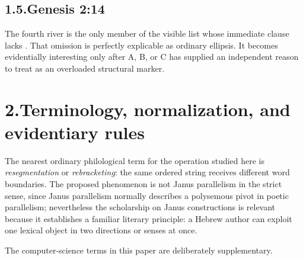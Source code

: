 \subsection*{1.5.\quad Genesis 2:14}


The fourth river is the only member of the visible list whose immediate clause lacks .  That omission is perfectly explicable as ordinary ellipsis.  It becomes evidentially interesting only after A, B, or C has supplied an independent reason to treat  as an overloaded structural marker.

\section*{2.\quad Terminology, normalization, and evidentiary rules}

The nearest ordinary philological term for the operation studied here is \emph{resegmentation} or \emph{rebracketing}: the same ordered string receives different word boundaries.  The proposed phenomenon is not Janus parallelism in the strict sense, since Janus parallelism normally describes a polysemous pivot in poetic parallelism; nevertheless the scholarship on Janus constructions is relevant because it establishes a familiar literary principle: a Hebrew author can exploit one lexical object in two directions or senses at once.\cite{Noegel1996,Watson1984}

The computer-science terms in this paper are deliberately supplementary.

